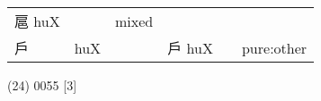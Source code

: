 \documentclass[14pt,a4paper]{scrartcl}
\begin{document}
\begin{longtable}[c]{@{}llllll@{}}
\begin{minipage}[t]{0.14\columnwidth}
扈 huX
\strut\end{minipage} &
\begin{minipage}[t]{0.14\columnwidth}\raggedright\strut
\strut\end{minipage} &
\begin{minipage}[t]{0.14\columnwidth}\raggedright\strut
mixed
\strut\end{minipage}\tabularnewline
\begin{minipage}[t]{0.14\columnwidth}\raggedright\strut
戶
\strut\end{minipage} &
\begin{minipage}[t]{0.14\columnwidth}\raggedright\strut
huX
\strut\end{minipage} &
\begin{minipage}[t]{0.14\columnwidth}\raggedright\strut
\strut\end{minipage} &
\begin{minipage}[t]{0.14\columnwidth}\raggedright\strut
戶 huX
\strut\end{minipage} &
\begin{minipage}[t]{0.14\columnwidth}\raggedright\strut
\strut\end{minipage} &
\begin{minipage}[t]{0.14\columnwidth}\raggedright\strut
pure:other
\strut\end{minipage}\tabularnewline
\bottomrule
\end{longtable}

(24) 0055 {[}3{]}
\end{document}
